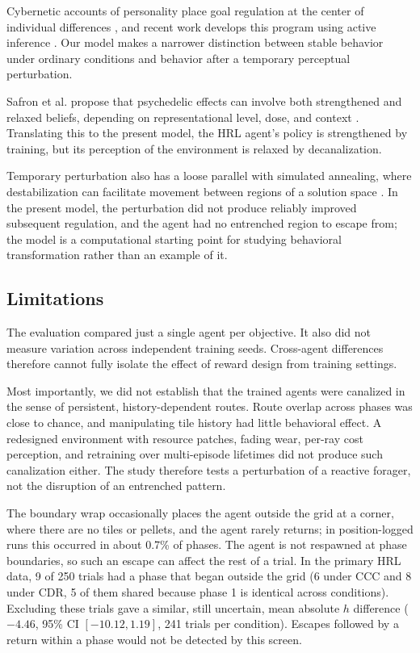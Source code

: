 \documentclass[12pt,fleqn]{article}
\begin{document}
Cybernetic accounts of personality place goal regulation at the center of individual differences \cite{safron_deyoung_2021}, and recent work develops this program using active inference \cite{safron_sheikhbahaee_2024}. Our model makes a narrower distinction between stable behavior under ordinary conditions and behavior after a temporary perceptual perturbation.

Safron et al. propose that psychedelic effects can involve both strengthened and relaxed beliefs, depending on representational level, dose, and context \cite{safron_albus_2025}. Translating this to the present model, the HRL agent's policy is strengthened by training, but its perception of the environment is relaxed by decanalization. 

Temporary perturbation also has a loose parallel with simulated annealing, where destabilization can facilitate movement between regions of a solution space \cite{kirkpatrick_optimization_1983, hajek_cooling_1988}. In the present model, the perturbation did not produce reliably improved subsequent regulation, and the agent had no entrenched region to escape from; the model is a computational starting point for studying behavioral transformation \cite{clingoDisintegrationReintegrationModelPsychological2025} rather than an example of it.

\subsection{Limitations}

The evaluation compared just a single agent per objective. It also did not measure variation across independent training seeds. Cross-agent differences therefore cannot fully isolate the effect of reward design from training settings.

Most importantly, we did not establish that the trained agents were canalized in the sense of persistent, history-dependent routes. Route overlap across phases was close to chance, and manipulating tile history had little behavioral effect. A redesigned environment with resource patches, fading wear, per-ray cost perception, and retraining over multi-episode lifetimes did not produce such canalization either. The study therefore tests a perturbation of a reactive forager, not the disruption of an entrenched pattern.

The boundary wrap occasionally places the agent outside the grid at a corner, where there are no tiles or pellets, and the agent rarely returns; in position-logged runs this occurred in about 0.7\% of phases. The agent is not respawned at phase boundaries, so such an escape can affect the rest of a trial. In the primary HRL data, 9 of 250 trials had a phase that began outside the grid (6 under CCC and 8 under CDR, 5 of them shared because phase 1 is identical across conditions). Excluding these trials gave a similar, still uncertain, mean absolute $h$ difference ($-4.46$, 95\% CI $[-10.12, 1.19]$, 241 trials per condition). Escapes followed by a return within a phase would not be detected by this screen.
\end{document}
